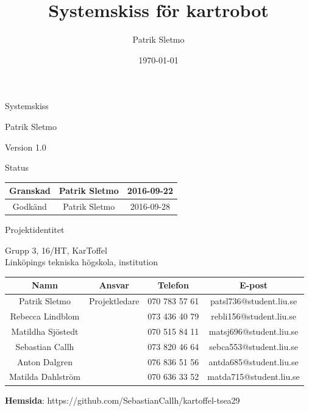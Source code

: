 \documentclass{article}
\title{Systemskiss för kartrobot}
\author{Patrik Sletmo}
\date{\today}
\begin{document}
\thispagestyle{empty}

{
\sffamily
\centering
\large


{\huge 
Systemskiss
}

{\large
Patrik Sletmo
}

{\large
Version 1.0
}

\vspace{3.5cm}

Status
\begin{center}
\begin{tabular}{ | c | c | c | } 
\hline
Granskad & Patrik Sletmo & 2016-09-22 \\
\hline
Godkänd & Patrik Sletmo & 2016-09-28 \\
\hline
\end{tabular}
\end{center}
}
\clearpage

\vspace*{\fill}
{
\sffamily
\centering
\large


{\huge
Projektidentitet
}

{\large
Grupp 3, 16/HT, KarToffel \\ Linköpings tekniska högskola, institution
}

\vspace{0.5cm}

\begin{table}[H]
\centering
\begin{tabular}{ | c | c | c | c |}
\hline
Namn & Ansvar & Telefon & E-post \\
\hline
Patrik Sletmo & Projektledare & 070 783 57 61 & patsl736@student.liu.se \\
\hline
Rebecca Lindblom &  & 073 436 40 79 & rebli156@student.liu.se \\
\hline
Matildha Sjöstedt &  & 070 515 84 11 & matsj696@student.liu.se \\
\hline
Sebastian Callh &  & 073 820 46 64 & sebca553@student.liu.se \\
\hline
Anton Dalgren &  & 076 836 51 56 & antda685@student.liu.se \\
\hline
Matilda Dahlström &  & 070 636 33 52 & matda715@student.liu.se \\
\hline
\end{tabular}
\end{table}
}

\begin{center}
\textbf{Hemsida}: https://github.com/SebastianCallh/kartoffel-tsea29
\end{center}
\end{document}
